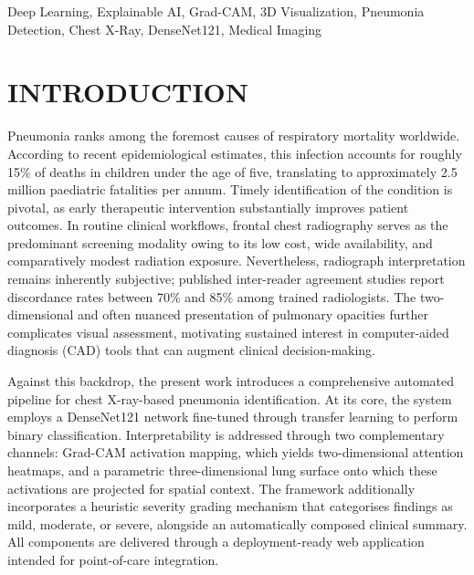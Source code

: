 \documentclass[conference]{IEEEtran}
\begin{document}
\begin{IEEEkeywords}
Deep Learning, Explainable AI, Grad-CAM, 3D Visualization, Pneumonia Detection, Chest X-Ray, DenseNet121, Medical Imaging
\end{IEEEkeywords}


\section{\textbf{INTRODUCTION}}
\noindent\hspace{0.5cm}Pneumonia ranks among the foremost causes of respiratory mortality worldwide. According to recent epidemiological estimates, this infection accounts for roughly 15\% of deaths in children under the age of five, translating to approximately 2.5 million paediatric fatalities per annum. Timely identification of the condition is pivotal, as early therapeutic intervention substantially improves patient outcomes. In routine clinical workflows, frontal chest radiography serves as the predominant screening modality owing to its low cost, wide availability, and comparatively modest radiation exposure. Nevertheless, radiograph interpretation remains inherently subjective; published inter-reader agreement studies report discordance rates between 70\% and 85\% among trained radiologists. The two-dimensional and often nuanced presentation of pulmonary opacities further complicates visual assessment, motivating sustained interest in computer-aided diagnosis (CAD) tools that can augment clinical decision-making.

Against this backdrop, the present work introduces a comprehensive automated pipeline for chest X-ray-based pneumonia identification. At its core, the system employs a DenseNet121 network fine-tuned through transfer learning to perform binary classification. Interpretability is addressed through two complementary channels: Grad-CAM activation mapping, which yields two-dimensional attention heatmaps, and a parametric three-dimensional lung surface onto which these activations are projected for spatial context. The framework additionally incorporates a heuristic severity grading mechanism that categorises findings as mild, moderate, or severe, alongside an automatically composed clinical summary. All components are delivered through a deployment-ready web application intended for point-of-care integration.
\end{document}

